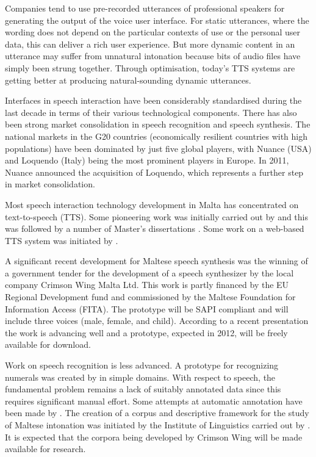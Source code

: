 \documentclass[]{../../metanetpaper}
\begin{document}
\begin{multicols}{2}
Companies tend to use pre-recorded utterances of professional speakers for generating the output of the voice user interface. For static utterances, where the wording does not depend on the particular contexts of use or the personal user data, this can deliver a rich user experience.  But more dynamic content in an utterance may suffer from unnatural intonation because bits of audio files have simply been strung together. Through optimisation, today’s TTS systems are getting better at producing natural-sounding dynamic utterances.


Interfaces in speech interaction have been considerably standardised during the last decade in terms of their various technological components. There has also been strong market consolidation in speech recognition and speech synthesis. The national markets in the G20 countries (economically resilient countries with high populations) have been dominated by just five global players, with Nuance (USA) and Loquendo (Italy) being the most prominent players in Europe. In 2011, Nuance announced the acquisition of Loquendo, which represents a further step in market consolidation.

Most speech interaction technology development in Malta has concentrated on text-to-speech (TTS). Some pioneering work was initially carried out by \cite{Micallef:1997} and this was followed by a number of Master’s dissertations \cite{Farrugia:2005}. Some work on a web-based TTS system was initiated by \cite{Buhagiar-Micallef:2008}.

A significant recent development for Maltese speech synthesis was the winning of a government tender for the development of a speech synthesizer by the local company Crimson Wing Malta Ltd. This work is partly financed by the EU Regional Development fund and commissioned by the Maltese Foundation for Information Access (FITA). The prototype will be SAPI compliant and will include three voices (male, female, and child). According to a recent presentation \cite{Borg-et-al:2011} the work is advancing well and a prototype, expected in 2012, will be freely available for download. 

Work on speech recognition is less advanced. A prototype for recognizing numerals was created by \cite{Calleja:2002} in simple domains. With respect to speech, the fundamental problem remains a lack of suitably annotated data since this requires significant manual effort. Some attempts at automatic annotation have been made by \cite{Psaila:2008}. The creation of a corpus and descriptive framework for the study of Maltese intonation was initiated by the Institute of Linguistics carried out by \cite{Vella-Farrugia:2006}. It is expected that the corpora being developed by Crimson Wing will be made available for research.


\end{multicols}
\end{document}

